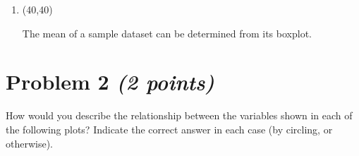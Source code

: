 \documentclass[11pt,twoside]{article}
\numberwithin{equation}{section}
\newcommand{\?}{\stackrel{?}{=}}
\newcommand{\gr}{\color{green!40!black}}
\begin{document}
\begin{enumerate}[\bf (i)]
  
  \smallskip
  
\item \hfill
  \begin{minipage}{.1\linewidth}
    \framebox(40,40){\gr }
  \end{minipage}\quad
  \begin{minipage}{.85\linewidth}
    The mean of a sample dataset can be determined from its boxplot. %
  \end{minipage}
  
  \smallskip
  
  \end{enumerate}

  

\eject  
\section*{Problem 2 \textit{(2 points)}}
How would you describe the relationship between the variables shown in each of the following plots? Indicate the correct answer in each case (by circling, or otherwise).
\end{document}
